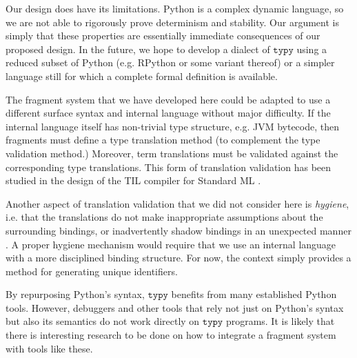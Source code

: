 \documentclass[preprint,10pt]{sigplanconf}
\newcommand{\typy}{\texttt{typy}}
\begin{document}

Our design does have its limitations. Python is a complex dynamic language, so we are not able to rigorously prove determinism and stability. Our argument is simply that these properties are essentially immediate consequences of our proposed design. In the future, we hope to develop a dialect of $\typy$ using a reduced subset of Python (e.g. RPython \cite{ancona2007rpython} or some variant thereof) or a simpler language still for which a complete formal definition is available. %

The fragment system that we have developed here could be adapted to use a different surface syntax and internal language without major difficulty. If the internal language itself has non-trivial type structure, e.g. JVM bytecode, then fragments must define a type translation method (to complement the type validation method.) Moreover, term translations must be validated against the corresponding type translations. This form of translation validation has been studied in the design of the TIL compiler for Standard ML \cite{tarditi+:til-OLD}. 

Another aspect of translation validation that we did not consider here is \emph{hygiene}, i.e. that the translations do not make inappropriate assumptions about the surrounding bindings, or inadvertently shadow bindings in an unexpected manner \cite{Kohlbecker86a,DBLP:conf/popl/Adams15}. A proper hygiene mechanism would require that we use an internal language with a more disciplined binding structure. For now, the context simply provides a method for generating unique identifiers. 

By repurposing Python's syntax, $\typy$ benefits from many established Python tools. However, debuggers and other tools that rely not just on Python's syntax but also its semantics do not work directly on $\typy$ programs. It is likely that there is interesting research to be done on how to integrate a fragment system with tools like these. %
\end{document}
